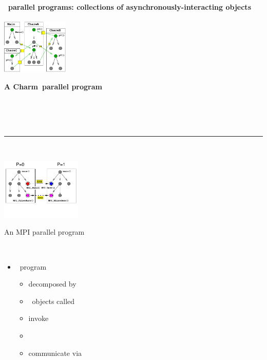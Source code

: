 \begin{frame}[fragile]
\secframetitle{\ssCharm}
\framesubtitle{\charm\ parallel programs: collections of asynchronously-interacting objects}
\begin{minipage}[t]{1.75in}
\begin{center}
\begin{minipage}{1.25in}
\includegraphics[width=1.25in]{charm.pdf}
\ \\
\centerline{\scriptsize\textbf{A Charm\pp\ parallel program}}
\end{minipage}\\ \ \\
\ \\
\hrule
\ \\
\begin{minipage}{1.50in}
\includegraphics[width=1.50in]{mpi.pdf}\\
\vspace{-0.5in}
\centerline{\scriptsize{An MPI parallel program}}
\end{minipage}
\end{center}
\end{minipage} \ 
\begin{minipage}[t]{2.50in}
\vspace{-0.70in}
\begin{itemize}
\item \charm\ program
  \begin{itemize}
  \item decomposed by 
  \item \charm\ objects called 
  \item invoke 
  \item {}
  \item communicate via 

\end{itemize}
\end{itemize}
\end{minipage}
\end{frame}

